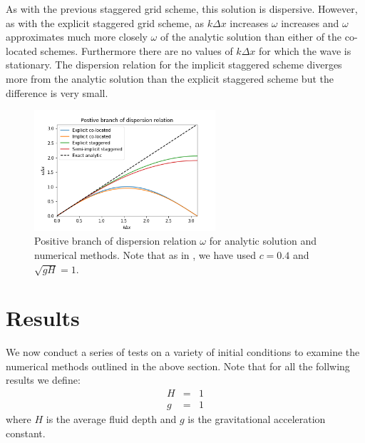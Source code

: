 \documentclass[a4paper, 10.8pt, notitlepage]{article}
\begin{document}
As with the previous staggered grid scheme, this solution is dispersive. However, as with the explicit staggered grid scheme, as $k\Delta x$ increases $\omega$ increases and $\omega$ approximates much more closely $\omega$ of the analytic solution than either of the co-located schemes. Furthermore there are no values of $k\Delta x$ for which the wave is stationary. The dispersion relation for the implicit staggered scheme diverges more from the analytic solution than the explicit staggered scheme but the difference is very small. 

\begin{figure}[H]
	\begin{center}

	\centering
	\includegraphics[width=0.6\textwidth]{dispersion_relations.png}
	\caption{Positive branch of dispersion relation $\omega$ for analytic solution and numerical methods. Note that as in \cite{MPE textbook}, we have used $c=0.4$ and $\sqrt{gH} = 1$.} \label{dispersionfigure}

	\end{center}
\end{figure}

\section{Results}\label{resultssection}
We now conduct a series of tests on a variety of initial conditions to examine the numerical methods outlined in the above section. Note that for all the follwing results we define:
\begin{eqnarray}
H & = & 1\\
g & = & 1
\end{eqnarray}
where $H$ is the average fluid depth and $g$ is the gravitational acceleration constant.
\end{document}
